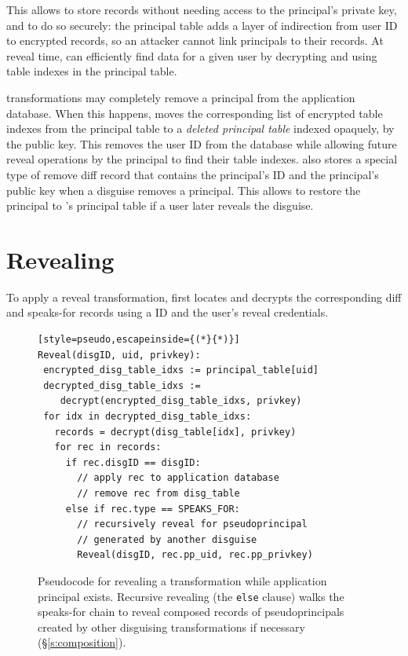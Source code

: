 %
This allows \sys to store records without needing access to the principal's
private key, and to do so securely: the principal table adds a layer of
indirection from user ID to encrypted records, so an attacker cannot link
principals to their records.
%
At reveal time, \sys can efficiently find \xxed data for a given user
by decrypting and using \xx table indexes in the principal table.
%
%

%
\Xxing transformations may completely remove a principal from the
application database.
%
When this happens, \sys moves the corresponding list of encrypted \xx table
indexes from the principal table to a \emph{deleted principal table} indexed
opaquely, \eg by the public key.
%
This removes the user ID from the database while allowing future reveal
operations by the principal to find their \xx table indexes.
%
\sys also stores a special type of remove diff record that contains the
principal's ID and the principal's public key when a disguise removes a principal.  This
allows \sys to restore the principal to \sys's principal table if a user later
reveals the disguise.
%

\section{Revealing}
\label{s:reveal}

%
To apply a reveal transformation, \sys first locates and decrypts the
corresponding diff and speaks-for records using a \xx ID and the user’s reveal
credentials.
%

\begin{figure}[t]
  \small
\begin{lstlisting}[style=pseudo,escapeinside={(*}{*)}]
Reveal(disgID, uid, privkey):
 encrypted_disg_table_idxs := principal_table[uid]
 decrypted_disg_table_idxs :=
    decrypt(encrypted_disg_table_idxs, privkey)
 for idx in decrypted_disg_table_idxs:
   records = decrypt(disg_table[idx], privkey)
   for rec in records:
     if rec.disgID == disgID:
       // apply rec to application database
       // remove rec from disg_table
     else if rec.type == SPEAKS_FOR:
       // recursively reveal for pseudoprincipal
       // generated by another disguise
       Reveal(disgID, rec.pp_uid, rec.pp_privkey)
\end{lstlisting}
    \caption[Revealing restores all
    reachable disguised data using the user's reveal credentials.]{Pseudocode for revealing a \xxing transformation while
    application principal  exists. Recursive revealing (the
    \texttt{\small else} clause) walks the speaks-for chain to reveal composed
    records of pseudoprincipals created by other disguising transformations
    if necessary (\S\ref{s:composition}).}
  \label{f:revealpseudo}
\end{figure}


